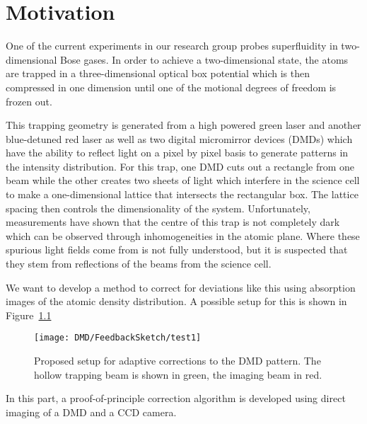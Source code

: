 

\chapter{Motivation}
\label{cha:dmd_motivation}
One of the current experiments in our research group probes superfluidity in two-di\-men\-sional Bose gases. In order to achieve a two-dimensional state, the atoms are trapped in a three-dimensional optical box potential which is then compressed in one dimension until one of the motional degrees of freedom is frozen out. 

This trapping geometry is generated from a high powered green laser and another blue-detuned red laser as well as two digital micromirror devices (DMDs) which have the ability to reflect light on a pixel by pixel basis to generate patterns in the intensity distribution. For this trap, one DMD cuts out a rectangle from one beam while the other creates two sheets of light which interfere in the science cell to make a one-dimensional lattice that intersects the rectangular box. The lattice spacing then controls the dimensionality of the system. 
Unfortunately, measurements have shown that the centre of this trap is not completely dark which can be observed through inhomogeneities in the atomic plane. Where these spurious light fields come from is not fully understood, but it is suspected that they stem from reflections of the beams from the science cell.

We want to develop a method to correct for deviations like this using absorption images of the atomic density distribution. A possible setup for this is shown in Figure~\ref{fig:dmd_feedback_sketch}
\begin{figure}[htbp]
    \centering
    \texttt{[image: DMD/FeedbackSketch/test1]}
    \caption[Proposed setup for adaptive corrections to the DMD pattern]{Proposed setup for adaptive corrections to the DMD pattern. The hollow trapping beam is shown in green, the imaging beam in red.}
    \label{fig:dmd_feedback_sketch}
\end{figure}


In this part, a proof-of-principle correction algorithm is developed using direct imaging of a DMD and a CCD camera.